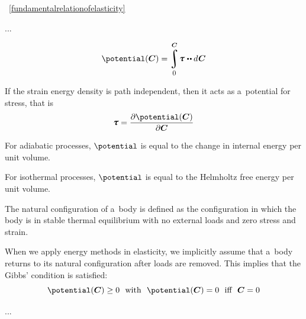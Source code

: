 

~\eqref{fundamentalrelationofelasticity}

...

{\small

\[ \potential(\bm{C}) = \displaystyle \integral_{\raisemath{-0.25em}{\hspace{-0.1ex}\scalebox{0.85}{$0$}}}^{\raisemath{.15em}{\bm{C}}} \hspace{-0.25ex} \cauchystress \hspace{.1ex} \dotdotp d \hspace{.1ex} \boldsymbol{\bm{C}} \]

If the strain energy density is path independent, then it acts as a~potential for stress, that is
\[ \displaystyle \cauchystress = {\frac{\partial \potential(\bm{C})}{\partial \bm{C}}} \]

For adiabatic processes, ${\potential}$ is equal to the change in internal energy per unit volume.

For isothermal processes, ${\potential}$ is equal to the Helmholtz free energy per unit volume.

The natural configuration of a~body is defined as the configuration in which the body is in stable thermal equilibrium with no external loads and zero stress and strain.

When we apply energy methods in elasticity, we implicitly assume that a~body returns to its natural configuration after loads are removed. This implies that the Gibbs’ condition is satisfied:
\[ \potential(\bm{C}) \geq 0~~{\text{with}}~~\potential(\bm{C}) = 0~~{\text{iff}}~~\bm{C} = 0 \]

\par}

...

